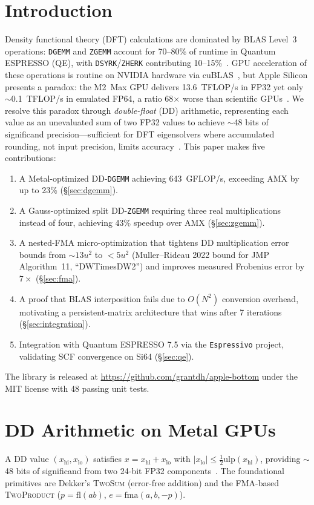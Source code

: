 \documentclass[conference]{IEEEtran}
\newcommand{\DGEMM}{\texttt{DGEMM}}
\newcommand{\ZGEMM}{\texttt{ZGEMM}}
\newcommand{\DSYRK}{\texttt{DSYRK}}
\newcommand{\ZHERK}{\texttt{ZHERK}}
\newcommand{\hi}{\mathrm{hi}}
\newcommand{\lo}{\mathrm{lo}}
\newcommand{\fl}{\mathrm{fl}}
\newcommand{\ulp}{\mathrm{ulp}}
\begin{document}
\section{Introduction}
\label{sec:intro}
Density functional theory (DFT) calculations are dominated by BLAS Level~3 operations: \DGEMM{} and \ZGEMM{} account for 70--80\% of runtime in Quantum ESPRESSO (QE), with \DSYRK{}/\ZHERK{} contributing 10--15\%~\cite{QE2009,ELPA2014}. GPU acceleration of these operations is routine on NVIDIA hardware via cuBLAS~\cite{cuBLAS}, but Apple Silicon presents a paradox: the M2~Max GPU delivers 13.6~TFLOP/s in FP32 yet only ${\sim}$0.1~TFLOP/s in emulated FP64, a ratio 68$\times$ worse than scientific GPUs~\cite{AppleVsOranges2025}.
We resolve this paradox through \emph{double-float} (DD) arithmetic, representing each value as an unevaluated sum of two FP32 values to achieve ${\sim}$48 bits of significand precision---sufficient for DFT eigensolvers where accumulated rounding, not input precision, limits accuracy~\cite{Bailey2005,Hida2001}.
This paper makes five contributions:
\begin{enumerate}
\item A Metal-optimized DD-\DGEMM{} achieving 643~GFLOP/s, exceeding AMX by up to 23\% (\S\ref{sec:dgemm}).
\item A Gauss-optimized split DD-\ZGEMM{} requiring three real multiplications instead of four, achieving 43\% speedup over AMX (\S\ref{sec:zgemm}).
\item A nested-FMA micro-optimization that tightens DD multiplication error bounds from ${\sim}13u^2$ to $<5u^2$ (Muller--Rideau 2022 bound for JMP Algorithm~11, ``DWTimesDW2'') and improves measured Frobenius error by $7{\times}$ (\S\ref{sec:fma}).
\item A proof that BLAS interposition fails due to $O(N^2)$ conversion overhead, motivating a persistent-matrix architecture that wins after 7 iterations (\S\ref{sec:integration}).
\item Integration with Quantum ESPRESSO 7.5 via the \texttt{Espressivo} project, validating SCF convergence on Si64 (\S\ref{sec:qe}).
\end{enumerate}
The library is released at \url{https://github.com/grantdh/apple-bottom} under the MIT license with 48 passing unit tests.
\section{DD Arithmetic on Metal GPUs}
\label{sec:background}
A DD value $(x_\hi, x_\lo)$ satisfies $x = x_\hi + x_\lo$ with $|x_\lo| \leq \tfrac{1}{2}\ulp(x_\hi)$, providing ${\sim}$48 bits of significand from two 24-bit FP32 components~\cite{Dekker1971,Knuth1997}. The foundational primitives are Dekker's \textsc{TwoSum} (error-free addition) and the FMA-based \textsc{TwoProduct} ($p = \fl(ab)$, $e = \mathrm{fma}(a,b,-p)$).
\end{document}
